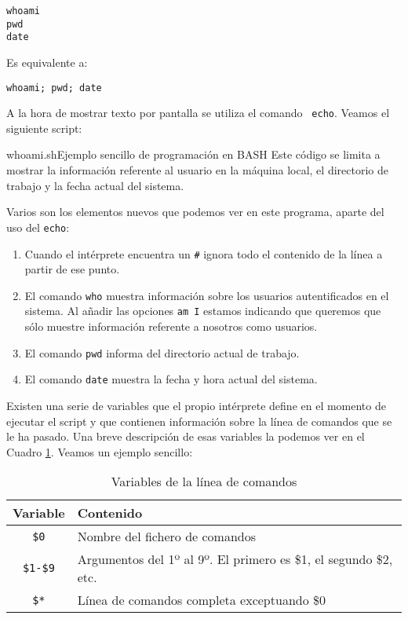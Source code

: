\begin{verbatim}
whoami
pwd
date
\end{verbatim}

Es equivalente a:

\begin{verbatim}
whoami; pwd; date
\end{verbatim}

A la  hora de mostrar  texto por pantalla  se utiliza el  comando {\tt
echo}. Veamos el siguiente script:

\begin{ejemplo}{whoami.sh}{Ejemplo sencillo de programación en BASH}
Este código se limita a mostrar la información referente al usuario
en la máquina local, el directorio de trabajo y la fecha actual
del sistema.
\end{ejemplo}

Varios son  los elementos nuevos que  podemos ver en este  programa,
aparte del uso del {\tt echo}:

\begin{enumerate}

\item  Cuando el  intérprete  encuentra  un {\tt  \#}  ignora todo  el
contenido de la línea a partir de ese punto.

\item El  comando {\tt  who} muestra información  sobre los
usuarios autentificados en el sistema.  Al añadir las opciones {\tt am
I}  estamos  indicando  que  queremos  que  sólo  muestre  información
referente a nosotros como usuarios.

\item El comando {\tt pwd} informa del directorio actual de
trabajo.

\item El comando {\tt date} muestra la fecha y hora actual
del sistema.

\end{enumerate}

Existen una serie  de variables que el propio intérprete  define en el
momento de  ejecutar el  script y que  contienen información  sobre la
línea de comandos  que se le ha pasado. Una  breve descripción de esas
variables la podemos ver en el Cuadro \ref{cmdline}. Veamos un ejemplo
sencillo:

\begin{table}[hbtp]
\centering
\begin{tabular}{|c|l|}
\hline
Variable		&	Contenido \\
\hline
{\tt \$0}		&	Nombre del fichero de comandos \\
{\tt \$1-\$9}		&	Argumentos del 1º al 9º. El primero es \$1, el segundo \$2, etc. \\
{\tt \$*}		&	Línea de comandos completa exceptuando \$0 \\
\hline
\end{tabular}
\caption{Variables de la línea de comandos}\label{cmdline}
\end{table}


